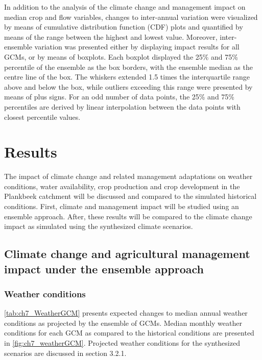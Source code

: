 In addition to the analysis of the climate change and management impact on median crop and flow variables, changes to inter-annual variation were visualized by means of cumulative distribution function (CDF) plots and quantified by means of the range between the highest and lowest value. Moreover, inter-ensemble variation was presented either by displaying impact results for all GCMs, or by means of boxplots. Each boxplot displayed the 25\% and 75\% percentile of the ensemble as the box borders, with the ensemble median as the centre line of the box. The whiskers extended 1.5 times the interquartile range above and below the box, while outliers exceeding this range were presented by means of plus signs. For an odd number of data points, the 25\% and 75\% percentiles are derived by linear interpolation between the data points with closest percentile values.

\section{Results}
The impact of climate change and related management adaptations on weather conditions, water availability, crop production and crop development in the Plankbeek catchment will be discussed and compared to the simulated historical conditions. First, climate and management impact will be studied using an ensemble approach. After, these results will be compared to the climate change impact as simulated using the synthesized climate scenarios. 

\subsection{Climate change and agricultural management impact under the ensemble approach}
\subsubsection{Weather conditions} 
\autoref{tab:ch7_WeatherGCM} presents expected changes to median annual weather conditions as projected by the ensemble of GCMs. Median monthly weather conditions for each GCM as compared to the historical conditions are presented in \autoref{fig:ch7_weatherGCM}. Projected weather conditions for the synthesized scenarios are discussed in section 3.2.1.

